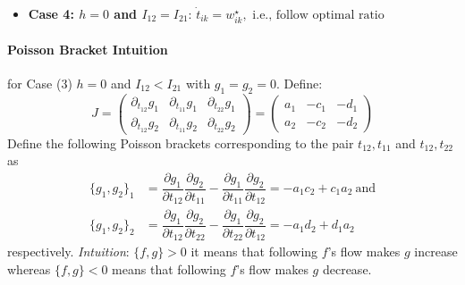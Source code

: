 \documentclass{article}
\begin{document}
\begin{itemize}[leftmargin=*, nosep]
\begin{itemize}[leftmargin=*]
\begin{enumerate}[label=(\roman*),leftmargin=*]
    \item  \textit{$g_2$ starts dominating:} $\dot{h}=\dot{g}_2=0$, $\dot{t}_{12}=\frac{d_2}{a_1+d_2},\dot{t}_{11}=\frac{a_1}{a_1+d_2}$, $\dot{g}_1= \frac{d_2a_1-a_2d_1}{a_1+d_2}$\\
      \end{enumerate}
  \end{itemize}

  \item \textbf{Case 4: $h = 0$ and $I_{12} = I_{21}$}: $\dot{t}_{ik} = w^{\star}_{ik}, \text{ i.e., follow optimal ratio}$
\end{itemize}

\paragraph{Poisson Bracket Intuition} for Case (3) $h=0$ and $I_{12}<I_{21}$ with $g_1=g_2=0$. Define:
\[
J =
\begin{pmatrix}
\partial_{t_{12}} g_1 & \partial_{t_{11}} g_1 & \partial_{t_{22}} g_1 \\
\partial_{t_{12}} g_2 & \partial_{t_{11}} g_2 & \partial_{t_{22}} g_2
\end{pmatrix} =
\begin{pmatrix}
a_1 & -c_1 & -d_1 \\
a_2 & -c_2 & -d_2
\end{pmatrix}
\]
Define the following Poisson brackets corresponding to the pair $t_{12},t_{11}$ and $t_{12},t_{22}$ as
\begin{align*}
    \{g_1,g_2\}_1&=\dfrac{\partial g_1}{\partial t_{12}}\dfrac{\partial g_2}{\partial t_{11}}-\dfrac{\partial g_1}{\partial t_{11}}\dfrac{\partial g_2}{\partial t_{12}} = -a_1c_2+c_1a_2\ \text{and}\\
        \{g_1,g_2\}_2&=\dfrac{\partial g_1}{\partial t_{12}}\dfrac{\partial g_2}{\partial t_{22}}-\dfrac{\partial g_1}{\partial t_{22}}\dfrac{\partial g_2}{\partial t_{12}} = -a_1d_2+d_1a_2
\end{align*}
respectively. 
\textit{Intuition}: $\{f,g\}>0$ it means that following $f$'s flow makes $g$ increase whereas $\{f,g\}<0$   means that following $f$'s flow makes $g$ decrease. \\
\end{document}
